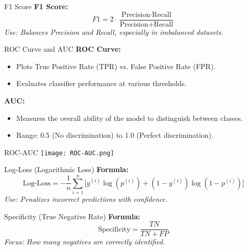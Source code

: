 \documentclass[serif, aspectratio=169]{beamer}
\begin{document}
\begin{frame}{F1 Score}
\textbf{F1 Score:}
\[
F1 = 2 \cdot \frac{\text{Precision} \cdot \text{Recall}}{\text{Precision} + \text{Recall}}
\]
\textit{Use: Balances Precision and Recall, especially in imbalanced datasets.}
\end{frame}

\begin{frame}{ROC Curve and AUC}
\textbf{ROC Curve:}
\begin{itemize}
    \item Plots True Positive Rate (TPR) vs. False Positive Rate (FPR).
    \item Evaluates classifier performance at various thresholds.
\end{itemize}

\textbf{AUC:}
\begin{itemize}
    \item Measures the overall ability of the model to distinguish between classes.
    \item Range: 0.5 (No discrimination) to 1.0 (Perfect discrimination).
\end{itemize}
\end{frame}

\begin{frame}{ROC-AUC}
    \centering
    \texttt{[image: ROC-AUC.png]}
\end{frame}

\begin{frame}{Log-Loss (Logarithmic Loss)}
\textbf{Formula:}
\[
\text{Log-Loss} = -\frac{1}{n} \sum_{i=1}^n \Big[y^{(i)} \log(p^{(i)}) + (1 - y^{(i)}) \log(1 - p^{(i)})\Big]
\]
\textit{Use: Penalizes incorrect predictions with confidence.}
\end{frame}

\begin{frame}{Specificity (True Negative Rate)}
\textbf{Formula:}
\[
\text{Specificity} = \frac{TN}{TN + FP}
\]
\textit{Focus: How many negatives are correctly identified.}
\end{frame}
\end{document}
